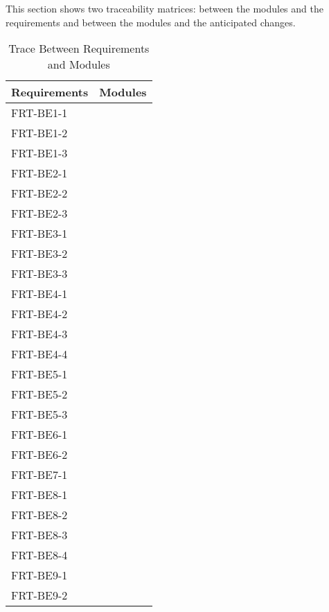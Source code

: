 \documentclass[12pt, titlepage]{article}
\begin{document}
This section shows two traceability matrices: between the modules and the requirements and between
the modules and the anticipated changes.

\begin{longtable}{p{} p{}}
	\caption{Trace Between Requirements and Modules}
	\label{TblRT}                            \\
	\toprule
	\textbf{Requirements} & \textbf{Modules} \\
	\midrule
	FRT-BE1-1             & ~                \\
	FRT-BE1-2             & ~                \\
	FRT-BE1-3             & ~                \\
	FRT-BE2-1             & ~                \\
	FRT-BE2-2             & ~                \\
	FRT-BE2-3             & ~                \\
	FRT-BE3-1             & ~                \\
	FRT-BE3-2             & ~                \\
	FRT-BE3-3             & ~                \\
	FRT-BE4-1             & ~                \\
	FRT-BE4-2             & ~                \\
	FRT-BE4-3             & ~                \\
	FRT-BE4-4             & ~                \\
	FRT-BE5-1             & ~                \\
	FRT-BE5-2             & ~                \\
	FRT-BE5-3             & ~                \\
	FRT-BE6-1             & ~                \\
	FRT-BE6-2             & ~                \\
	FRT-BE7-1             & ~                \\
	FRT-BE8-1             & ~                \\
	FRT-BE8-2             & ~                \\
	FRT-BE8-3             & ~                \\
	FRT-BE8-4             & ~                \\
	FRT-BE9-1             & ~                \\
	FRT-BE9-2             & ~                \\

\end{longtable}
\end{document}
